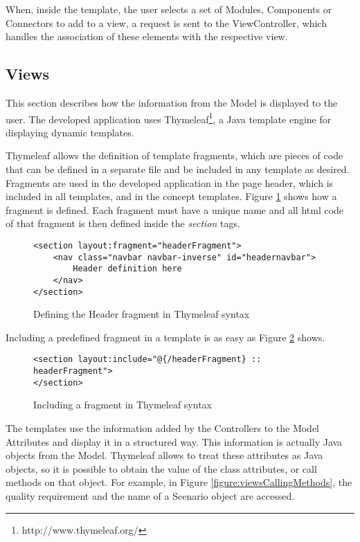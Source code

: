 \documentclass[conference]{IEEEtran}
\begin{document}
When, inside the template, the user selects a set of Modules, Components or Connectors to add to a view, a request is sent to the ViewController, which handles the association of these elements with the respective view.

\subsection{Views}
\label{section:Views}
This section describes how the information from the Model is displayed to the user. The developed application uses Thymeleaf\footnote{http://www.thymeleaf.org/}, a Java template engine for displaying dynamic templates.

Thymeleaf allows the definition of template fragments, which are pieces of code that can be defined in a separate file and be included in any template as desired. Fragments are used in the developed application in the page header, which is included in all templates, and in the concept templates. Figure \ref{figure:viewsHeaderFragment} shows how a fragment is defined. Each fragment must have a unique name and all html code of that fragment is then defined inside the \textit{section} tags.
\begin{figure}
\lstset{style=customhtml}
\begin{lstlisting}
<section layout:fragment="headerFragment">
	<nav class="navbar navbar-inverse" id="headernavbar">
		Header definition here	
	</nav>
</section>
\end{lstlisting}
\caption{Defining the Header fragment in Thymeleaf syntax}
\label{figure:viewsHeaderFragment}
\end{figure}

Including a predefined fragment in a template is as easy as Figure \ref{figure:viewsIncludeFragment} shows.
\begin{figure}
\lstset{style=customhtml}
\begin{lstlisting}
<section layout:include="@{/headerFragment} :: headerFragment">
</section>
\end{lstlisting}
\caption{Including a fragment in Thymeleaf syntax}
\label{figure:viewsIncludeFragment}
\end{figure}

The templates use the information added by the Controllers to the Model Attributes and display it in a structured way. This information is actually Java objects from the Model. Thymeleaf allows to treat these attributes as Java objects, so it is possible to obtain the value of the class attributes, or call methods on that object. For example, in Figure \ref{figure:viewsCallingMethods}, the quality requirement and the name of a Scenario object are accessed.
\end{document}
